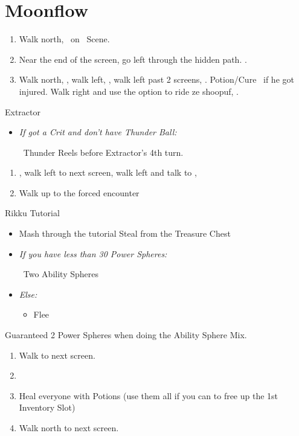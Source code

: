 \chapter{Moonflow}

\begin{enumerate}
	\item Walk north, \sd\ on \kimahri\ Scene.
	\item Near the end of the screen, go left through the hidden path. .
	\item Walk north, \sd, walk left, \sd, walk left past 2 screens, \sd.  Potion/Cure \tidus\ if he got injured. Walk right and use the  option to ride ze shoopuf, \sd.
\end{enumerate}
\bothvfill\winvfill\lossvfill
\begin{battle}[4000]{Extractor}
	\begin{itemize}
		\tidusf Haste self, then \wakka
		\wakkaf Attack
		\tidusf \textit{If Lightning Steel:}
		\begin{itemize}
			\item Cheer x1
		\end{itemize}
		\textit{Else:}
		\begin{itemize}
			\item Cheer x4
		\end{itemize}
		\tidusf Attack
		\item \textit{If got a Crit and don't have Thunder Ball:}
		\begin{itemize}
			\wakkaf \od\ Thunder Reels before Extractor's 4th turn.
		\end{itemize}
	\end{itemize}
\end{battle}
\begin{enumerate}[resume]
	\item \sd, walk left to next screen, walk left and talk to \rikku, \sd
	\item Walk up to the forced encounter
\end{enumerate}
\begin{battle}{Rikku Tutorial}
	\begin{itemize}
		\item Mash through the tutorial
		\rikkuf Steal from the Treasure Chest
		\item \textit{If you have less than 30 Power Spheres:}
		      \begin{itemize}
			      \rikkuf \od\ Two Ability Spheres
		      \end{itemize}
		\item \textit{Else:}
		      \begin{itemize}
			      \rikkuf \od\ Two Potions
				  \rikkuf Defend
				  \item Flee
		      \end{itemize}
	\end{itemize}
Guaranteed 2 Power Spheres when doing the Ability Sphere Mix.
\end{battle}
\begin{enumerate}[resume]
	\item Walk to next screen.
	\item \formation{\tidus}{\wakka}{\auron}
	\item Heal everyone with Potions (use them all if you can to free up the 1st Inventory Slot)
	\item Walk north to next screen.
\end{enumerate}